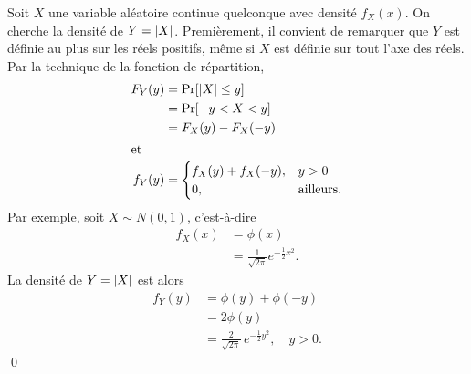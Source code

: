 \begin{exemple}
  \label{ex:transformations:val_abs}
  Soit $X$ une variable aléatoire continue quelconque avec densité
  $f_X(x)$. On cherche la densité de $Y = \lvert X \rvert$. Premièrement, il
  convient de remarquer que $Y$ est définie au plus sur les réels
  positifs, même si $X$ est définie sur tout l'axe des réels. Par la
  technique de la fonction de répartition,
  \begin{align*}
    F_Y(y)
    &= \operatorname{Pr} [ \lvert X \rvert \leq y ] \\
    &= \operatorname{Pr} [ -y < X < y ] \\
    &= F_X(y) - F_X(-y) \\
    \intertext{et}
    f_Y(y)
    &=
    \begin{cases}
      f_X(y) + f_X(-y), & y > 0 \\
      0, & \text{ailleurs}.
    \end{cases}
  \end{align*}
  Par exemple, soit $X \sim N(0, 1)$, c'est-à-dire
  \begin{align*}
    f_X(x)
    &= \phi(x) \\
    &= \frac{1}{\sqrt{2\pi}} e^{- \frac{1}{2} x^2}.
  \end{align*}
  La densité de $Y = \lvert X \rvert$ est alors
  \begin{align*}
    f_Y(y)
    &= \phi(y) + \phi(-y) \\
    &= 2 \phi(y) \\
    &= \frac{2}{\sqrt{2\pi}}\, e^{- \frac{1}{2} y^2}, \quad y > 0.
  \end{align*}
  \qed
\end{exemple}


